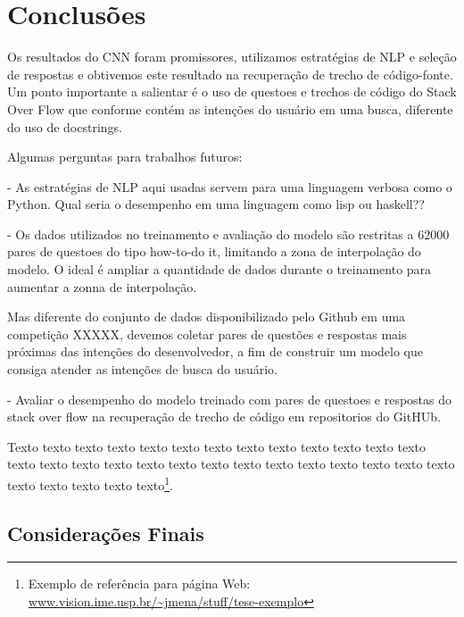 \chapter{Conclusões}
\label{cap:conclusoes}


Os resultados do CNN foram promissores, utilizamos estratégias de NLP e seleção de respostas e obtivemos este resultado na recuperação de trecho de código-fonte. Um ponto importante a salientar é o uso de questoes e trechos de código do Stack Over Flow que conforme \cite{cambronero-deep-learning-code-search:2019} contém as intenções do usuário em uma busca, diferente do uso de docstrings.

Algumas perguntas para trabalhos futuros:

 - As estratégias de NLP aqui usadas servem para uma linguagem verbosa como o Python. Qual seria o desempenho em uma linguagem como lisp ou haskell??
 
 - Os dados utilizados no treinamento e avaliação do modelo são restritas a 62000 pares de questoes do tipo how-to-do it, limitando a zona de interpolação do modelo. O ideal é ampliar a quantidade de dados durante o treinamento para aumentar a zonna de interpolação. 
 
 
 Mas diferente do conjunto de dados disponibilizado pelo Github em uma competição XXXXX, devemos coletar pares de questões e respostas mais próximas das intenções do desenvolvedor, a fim de construir um modelo que consiga atender as intenções de busca do usuário.
 
 - Avaliar o desempenho do modelo treinado com pares de questoes e respostas do stack over flow na recuperação de trecho de código em repositorios do GitHUb. 


Texto texto texto texto texto texto texto texto texto texto texto texto texto
texto texto texto texto texto texto texto texto texto texto texto texto texto
texto texto texto texto texto texto\footnote{Exemplo de referência para página
Web: \url{www.vision.ime.usp.br/~jmena/stuff/tese-exemplo}}.

\section{Considerações Finais} 

